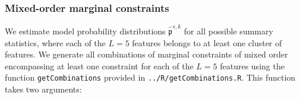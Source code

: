 \documentclass[
]{article}
\newenvironment{Shaded}{\begin{snugshade}}{\end{snugshade}}
\newcommand{\AttributeTok}[1]{\textcolor[rgb]{0.77,0.63,0.00}{#1}}
\newcommand{\ConstantTok}[1]{\textcolor[rgb]{0.00,0.00,0.00}{#1}}
\newcommand{\DecValTok}[1]{\textcolor[rgb]{0.00,0.00,0.81}{#1}}
\newcommand{\FloatTok}[1]{\textcolor[rgb]{0.00,0.00,0.81}{#1}}
\newcommand{\FunctionTok}[1]{\textcolor[rgb]{0.00,0.00,0.00}{#1}}
\newcommand{\NormalTok}[1]{#1}
\newcommand{\SpecialCharTok}[1]{\textcolor[rgb]{0.00,0.00,0.00}{#1}}
\newcommand{\StringTok}[1]{\textcolor[rgb]{0.31,0.60,0.02}{#1}}
\newcommand{\prob}[1]{\mathfrak{#1}}
\newcommand{\maxentP}{\hat{\prob p}}
\begin{document}
\begin{Shaded}
\end{Shaded}

\hypertarget{mixed-order-marginal-constraints}{%
\subsubsection{Mixed-order marginal
constraints}\label{mixed-order-marginal-constraints}}

We estimate model probability distributions \(\maxentP^{s, k}\) for all
possible summary statistics, where each of the \(L=5\) features belongs
to at least one cluster of features. We generate all combinations of
marginal constraints of mixed order encompassing at least one constraint
for each of the \(L = 5\) features using the function
\texttt{getCombinations} provided in \texttt{../R/getCombinations.R}.
This function takes two arguments:
\end{document}
